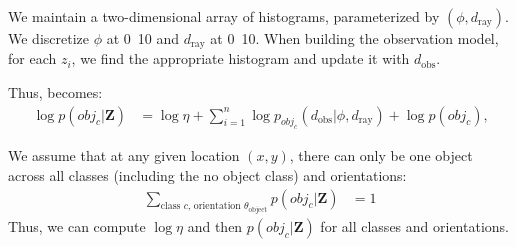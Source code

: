 We maintain a two-dimensional array of histograms, parameterized by $(\phi,
d_{\text{ray}})$. We discretize $\phi$ at \unit{0.10}{\rad} and
$d_{\text{ray}}$ at \unit{0.10}{\m}. When building the observation model, for
each $z_i$, we find the appropriate histogram and update it with
$d_{\text{obs}}$.

Thus,  becomes:
%
\begin{align}
  \log p( obj_c | \mathbf{Z} ) &=
   \log{\eta} + \sum_{i=1}^{n} { \log p_{obj_c}( d_{\text{obs}} | \phi, d_{\text{ray}}) }
   + \log p(obj_c)
   \text{,}
   \label{eq:obj_model_pos}
\end{align}

We assume that at any given location $(x, y)$, there can only be one object
across all classes (including the no object class) and orientations:
%
\begin{align}
  \sum_{ \text{class $c$, orientation $\theta_{\text{object}}$} }
  p(obj_c | \mathbf{Z})
  &= 1
\end{align}
%
Thus, we can compute $\log \eta$ and then $p(obj_c | \mathbf{Z})$ for all
classes and orientations.

